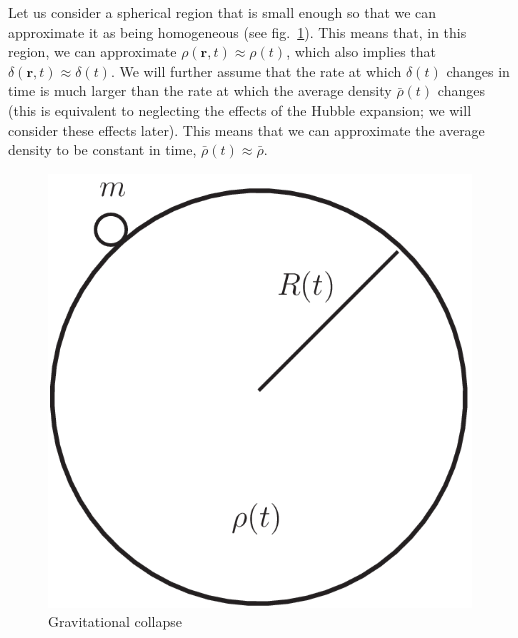 Let us consider a spherical region that is small enough so that we can approximate it as being homogeneous (see fig.\ \ref{fig:lec8_4}). This means that, in this region, we can approximate $\rho(\mathbf{r},t)\approx \rho(t)$, which also implies that $\delta(\mathbf{r},t)\approx \delta(t)$. We will further assume that the rate at which $\delta(t)$ changes in time is much larger than the rate at which the average density $\bar{\rho}(t)$ changes (this is equivalent to neglecting the effects of the Hubble expansion; we will consider these effects later). This means that we can approximate the average density to be constant in time, $\bar{\rho}(t)\approx \bar{\rho}$.
\begin{figure}[ht]
\begin{center}
\includegraphics[scale=0.3]{Draw/lec8_4.png}
\end{center}
\caption{Gravitational collapse}
\label{fig:lec8_4}
\end{figure}

